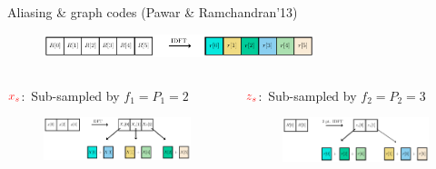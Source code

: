 \documentclass[10pt,xcolor=table]{beamer}
\begin{document}
	\begin{frame}{Aliasing \& graph codes (Pawar \& Ramchandran'13)}
	
		\begin{block}{}
			\begin{figure}[t]
				\centering
                \includegraphics[width=3.1in]{X_DFT}
			\end{figure}
		\end{block}
		\pause
		\begin{columns}
			
			\column{.47\textwidth}
			\begin{block}{{\small $\color{red}x_s$:\ Sub-sampled by $f_1=P_1=2$}}
				\begin{figure}[t]
					\centering
					\includegraphics[width=2.3in]{Xs}
				\end{figure}
			\end{block}
			\pause
			\begin{block}{{\small$\color{red}z_s$:\ Sub-sampled by $f_2=P_2=3$}}
				\begin{figure}[t]
					\centering
					\includegraphics[width=2.3in]{Zs}
				\end{figure}
			\end{block}
			\pause
%			


\end{columns}
\end{frame}
\end{document}
